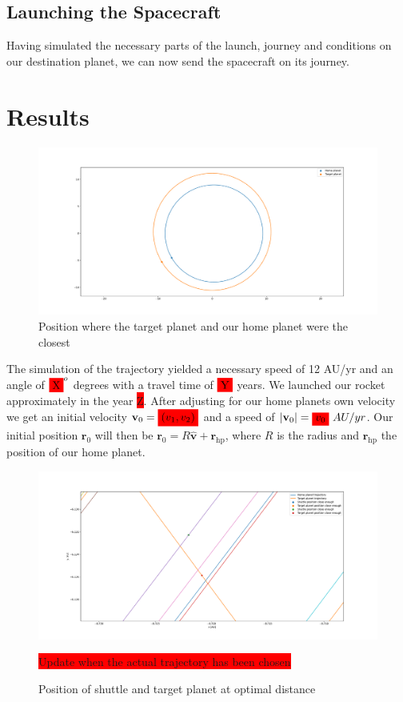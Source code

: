 \documentclass[reprint,english,notitlepage]{revtex4-2}
\begin{document}
\subsection{Launching the Spacecraft}\label{subsec:launching-the-spacecraft}
    Having simulated the necessary parts of the launch, journey and conditions on our destination planet, we can now send the spacecraft on its journey.

\newpage
\section{Results} \label{sec: results}
\begin{figure}[h!]
  \centering
  \includegraphics[scale = .125]{Figures/closest_orbit.pdf}
  \caption{Position where the target planet and our home planet were the closest}
  \label{fig: closest orbit}
\end{figure}

The simulation of the trajectory yielded a necessary speed of 12 AU/yr and an angle of $ \colorbox{red}{X} ^{o} $ degrees with a travel time of $ \colorbox{red}{Y} $ years. We launched our rocket approximately in the year \colorbox{red}{Z}. After adjusting for our home planets own velocity we get an initial velocity $ \mathbf{v}_0 = \colorbox{red}{$(v_1, v_2) $} $ and a speed of $ \left\vert \mathbf{v}_0 \right\vert = \colorbox{red}{$ v_0 $} \  AU / yr$. Our initial position $ \mathbf{r}_0 $ will then be $ \mathbf{r}_0 = R \hat{\mathbf{v}} + \mathbf{r}_{\text{hp}} $, where $ R $ is the radius and $ \mathbf{r}_{\text{hp}} $ the position of our home planet. 
\begin{figure}[h!]
  \centering
  \includegraphics[scale = .125]{Figures/good_enough_distance.pdf}
  \caption{Position of shuttle and target planet at optimal distance}
  \label{fig: good enough distance}
  \colorbox{red}{Update when the actual trajectory has been chosen}
\end{figure} 
\end{document}
